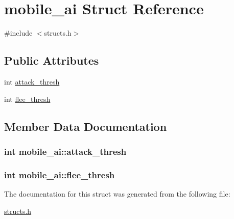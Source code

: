 \hypertarget{structmobile__ai}{\section{mobile\-\_\-ai Struct Reference}
\label{structmobile__ai}
}


{\ttfamily \#include $<$structs.\-h$>$}

\subsection*{Public Attributes}
\begin{DoxyCompactItemize}
\item 
int \hyperlink{structmobile__ai_a36cb2006278ac58ddd56ef4a4db1e14d}{attack\-\_\-thresh}
\item 
int \hyperlink{structmobile__ai_a5be32b2d2b489f7f43c3e6c667238eb0}{flee\-\_\-thresh}
\end{DoxyCompactItemize}


\subsection{Member Data Documentation}
\hypertarget{structmobile__ai_a36cb2006278ac58ddd56ef4a4db1e14d}{
\subsubsection[{attack\-\_\-thresh}]{\setlength{\rightskip}{0pt plus 5cm}int mobile\-\_\-ai\-::attack\-\_\-thresh}}\label{structmobile__ai_a36cb2006278ac58ddd56ef4a4db1e14d}
\hypertarget{structmobile__ai_a5be32b2d2b489f7f43c3e6c667238eb0}{
\subsubsection[{flee\-\_\-thresh}]{\setlength{\rightskip}{0pt plus 5cm}int mobile\-\_\-ai\-::flee\-\_\-thresh}}\label{structmobile__ai_a5be32b2d2b489f7f43c3e6c667238eb0}


The documentation for this struct was generated from the following file\-:\begin{DoxyCompactItemize}
\item 
\hyperlink{structs_8h}{structs.\-h}\end{DoxyCompactItemize}
